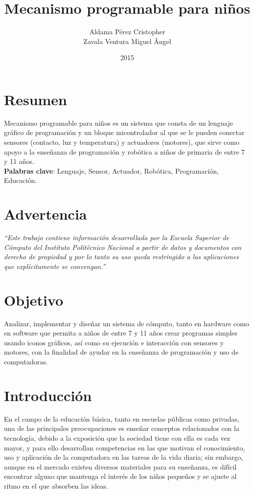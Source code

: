 \documentclass[letterpaper,10pt]{article}
\title{Mecanismo programable para niños}
\author{Aldama Pérez Cristopher\\ Zavala Ventura Miguel Ángel }
\date{2015}
\begin{document}
\maketitle
{}
\newpage
{}

\section{Resumen}

Mecanismo programable para niños es un sistema que consta de un lenguaje gráfico 
de programación y un bloque micontrolador al que se le pueden conectar sensores 
(contacto, luz y temperatura) y actuadores (motores), que sirve como apoyo a la 
enseñanza de programación y robótica a niños de primaria de entre 7 y 11 años.\\

\textbf{Palabras clave}: Lenguaje, Sensor, Actuador, Robótica, Programación, Educación.

\newpage
\section{Advertencia}
\textit{``Este trabajo contiene información desarrollada por la Escuela
 Superior de Cómputo del Instituto Politécnico Nacional a partir de datos y documentos
  con derecho de propiedad y por lo tanto su uso queda restringido a las 
  aplicaciones que explícitamente se convengan.''}

\newpage  
\tableofcontents
\newpage
  
\newpage
\section{Objetivo}

Analizar, implementar y diseñar un sistema de cómputo, tanto en hardware como
en software que permita a niños de entre 7 y 11 años crear programas simples
usando iconos gráficos, así como su ejecución e interacción con sensores y motores,
con la finalidad de ayudar en la enseñanza de programación y uso de computadoras.

\newpage
\section{Introducción}

En el campo de la educación básica, tanto en escuelas públicas como privadas, 
una de las principales preocupaciones es enseñar conceptos relacionados 
con la tecnología, debido a la exposición que la sociedad tiene 
con ella es cada vez mayor, y para ello desarrollan competencias en las 
que motivan el conocimiento, uso y aplicación de la computadora en las tareas 
de la vida diaria; sin embargo, aunque en el mercado existen diversos materiales 
para su enseñanza, es difícil encontrar alguno que mantenga el interés de los niños 
pequeños y se ajuste al ritmo en el que absorben las ideas.
\newline
\end{document}
